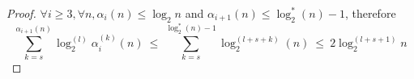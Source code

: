 \begin{proof}
  $\forall i\ge 3, \forall n, \alpha_i(n)\le \log_2n$ and $\alpha_{i+1}(n)\le \log_2^*(n)-1$, therefore
	\begin{equation*}
	\sum_{k=s}^{\alpha_{i+1}(n)} \log_2^{(l)}\alpha_i^{(k)}(n) \ \le \
	\sum_{k=s}^{\log_2^*(n)-1} \log_2^{(l+s+k)}(n) \ \le \
	2\log_2^{(l+s+1)} n
	\end{equation*}
\end{proof}
